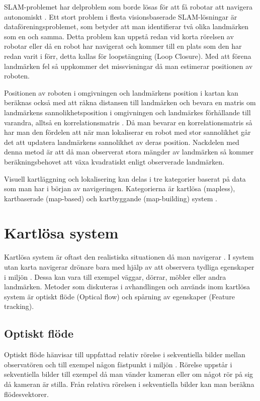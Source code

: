 SLAM-problemet har delproblem som borde lösas för att få robotar att navigera autonomiskt \citep{slamproblem}. Ett stort problem i flesta visionsbaserade SLAM-lösningar är dataföreningsproblemet, som betyder att man identifierar två olika landmärken som en och samma. Detta problem kan uppstå redan vid korta rörelsen av robotar eller då en robot har navigerat och kommer till en plats som den har redan varit i förr, detta kallas för loopstängning (Loop Closure). Med att förena landmärken fel så uppkommer det missvisningar då man estimerar positionen av roboten.

Positionen av roboten i omgivningen och landmärkens position i kartan kan beräknas också med att räkna distansen till landmärken och bevara en matris om landmärkens sannolikhetsposition i omgivningen och landmärkes förhållande till varandra, alltså en korrelationsmatris \citep{realslamproblem, ProbabilisticRobotics}. Då man bevarar en korrelationsmatris så har man den fördelen att när man lokaliserar en robot med stor sannolikhet går det att updatera landmärkens sannolikhet av deras position. Nackdelen med denna metod är att då man observerat stora mängder av landmärken så kommer beräkningsbehovet att växa kvadratiskt enligt observerade landmärken. 

Visuell kartläggning och lokalisering kan delas i tre kategorier baserat på data som man har i början av navigeringen. Kategorierna är kartlösa (mapless), kartbaserade (map-based) och kartbyggande (map-building) system \citep{geospatial}. 

\section{Kartlösa system}

Kartlösa system är oftast den realistiska situationen då man navigerar \citep{ProbabilisticRobotics}. I system utan karta navigerar drönare bara med hjälp av att observera tydliga egenskaper i miljön \citep{982903}. Dessa kan vara till exempel väggar, dörrar, möbler eller andra landmärken. Metoder som diskuteras i avhandlingen och används inom kartlösa system är optiskt flöde (Optical flow) och spårning av egenskaper (Feature tracking). 

\subsection{Optiskt flöde}

Optiskt flöde hänvisar till uppfattad relativ rörelse i sekventiella bilder mellan observatören och till exempel någon fästpunkt i miljön \citep{opticalflowuav}. Rörelse uppstår i sekventiella bilder till exempel då man vänder kameran eller om något rör på sig då kameran är stilla. Från relativa rörelsen i sekventiella bilder kan man beräkna flödesvektorer.

